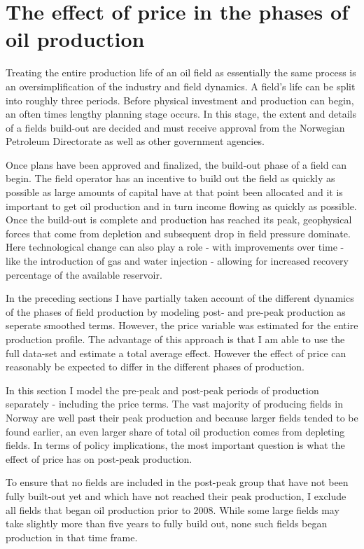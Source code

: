 \documentclass[11pt]{article}
\begin{document}
\section{The effect of price in the phases of oil production}

Treating the entire production life of an oil field as essentially the same process is an oversimplification of the industry and field dynamics.  A field's life can be split into roughly three periods.  Before physical investment and production can begin, an often times lengthy planning stage occurs.  In this stage, the extent and details of a fields build-out are decided and must receive approval from the Norwegian Petroleum Directorate as well as other government agencies.  

Once plans have been approved and finalized, the build-out phase of a field can begin.  The field operator has an incentive to build out the field as quickly as possible as large amounts of capital have at that point been allocated and it is important to get oil production and in turn income flowing as quickly as possible.  Once the build-out is complete and production has reached its peak, geophysical forces that come from depletion and subsequent drop in field pressure dominate.  Here technological change can also play a role - with improvements over time - like the introduction of gas and water injection - allowing for increased recovery percentage of the available reservoir. 

In the preceding sections I have partially taken account of the different dynamics of the phases of field production by modeling post- and pre-peak production as seperate smoothed terms.  However, the price variable was estimated for the entire production profile.  The advantage of this approach is that I am able to use the full data-set and estimate a total average effect.  However the effect of price can reasonably be expected to differ in the different phases of production.  

In this section I model the pre-peak and post-peak periods of production separately - including the price terms. The vast majority of producing fields in Norway are well past their peak production and because larger fields tended to be found earlier, an even larger share of total oil production comes from depleting fields.  In terms of policy implications, the most important question is what the effect of price has on post-peak production. 

To ensure that no fields are included in the post-peak group that have not been fully built-out yet and which have not reached their peak production, I exclude all fields that began oil production prior to 2008.  While some large fields may take slightly more than five years to fully build out, none such fields began production in that time frame.
\end{document}
